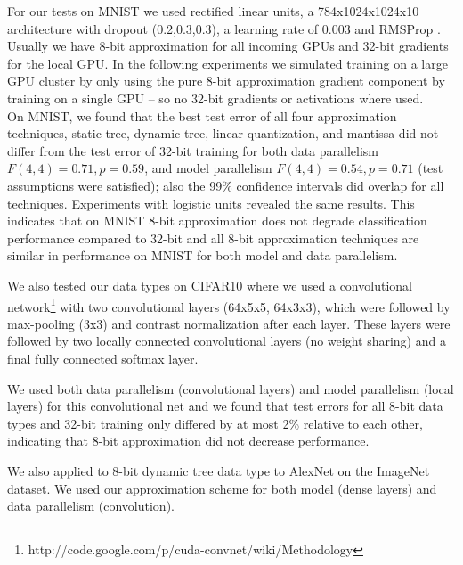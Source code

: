 \documentclass{article} %
\begin{document}
For our tests on MNIST we used rectified linear units, a 784x1024x1024x10 architecture with dropout (0.2,0.3,0.3), a learning rate of 0.003 and RMSProp  \citep{tieleman2012lecture}. Usually we have 8-bit approximation for all incoming GPUs and 32-bit gradients for the local GPU. In the following experiments we simulated training on a large GPU cluster by only using the pure 8-bit approximation gradient component by training on a single GPU -- so no 32-bit gradients or activations where used. \\
On MNIST, we found that the best test error of all four approximation techniques, static tree, dynamic tree, linear quantization, and mantissa  did not differ from the test error of 32-bit training for both data parallelism $F(4,4) = 0.71, p = 0.59$, and model parallelism $F(4,4) = 0.54, p = 0.71$ (test assumptions were satisfied); also the 99\% confidence intervals did overlap for all techniques. Experiments with logistic units revealed the same results. This indicates that on MNIST 8-bit approximation does not degrade classification performance compared to 32-bit and all 8-bit approximation techniques are similar in performance on MNIST for both model and data parallelism.


We also tested our data types on CIFAR10 where we used a convolutional network\footnote{http://code.google.com/p/cuda-convnet/wiki/Methodology} with two convolutional layers (64x5x5, 64x3x3), which were followed by max-pooling (3x3) and contrast normalization after each layer. These layers were followed by two locally connected convolutional layers (no weight sharing) and a final fully connected softmax layer.

We used both data parallelism (convolutional layers) and model parallelism (local layers) for this convolutional net and we found that test errors for all 8-bit data types and 32-bit training only differed by at most 2\% relative to each other, indicating that 8-bit approximation did not decrease performance.

We also applied to 8-bit dynamic tree data type to AlexNet on the ImageNet dataset. We used our approximation scheme for both model (dense layers) and data parallelism (convolution). 
\end{document}
